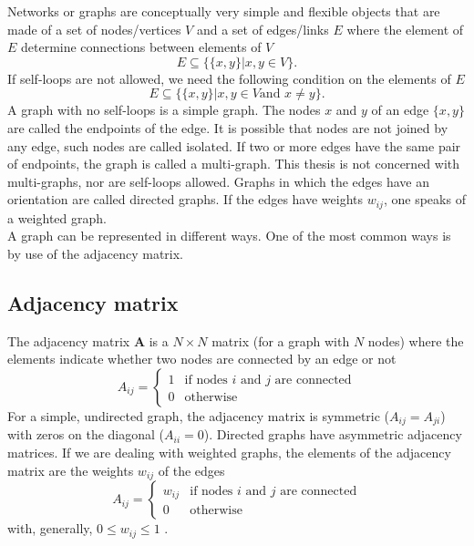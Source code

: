 \documentclass[11 pt , letterpaper , twoside , openright]{book}
\begin{document}
Networks or graphs are conceptually very simple and flexible objects that are made of a set of nodes/vertices $V$ and a set of edges/links $E$ where the element of $E$ determine connections between elements of $V$ \cite{Costa2018}
\begin{equation}
	E \subseteq \{\{x, y\}| x, y \in V \}.
\end{equation}
If self-loops are not allowed, we need the following condition on the elements of $E$
\begin{equation}
	E \subseteq \{\{x, y\}| x, y \in V \text{and\ } x \neq y \}.
\end{equation}
A graph with no self-loops is a simple graph. The nodes $x$ and $y$ of an edge $\{x, y\}$ are called the endpoints of the edge. It is possible that nodes are not joined by any edge, such nodes are called isolated. If two or more edges have the same pair of endpoints, the graph is called a multi-graph. This thesis is not concerned with multi-graphs, nor are self-loops allowed. Graphs in which the edges have an orientation are called directed graphs. If the edges have weights $w_{ij}$, one speaks of a weighted graph.\\
A graph can be represented in different ways. One of the most common ways is by use of the adjacency matrix.\\

\subsection{Adjacency matrix}

The adjacency matrix \textbf{A} is a $N \times N$ matrix (for a graph with $N$ nodes) where the elements indicate whether two nodes are connected by an edge or not \cite{Mata2020}
\begin{equation}
	A_{ij} = 
	\begin{cases}
		1 & \text{if nodes $i$ and $j$ are connected}\\
		0 & \text{otherwise}
	\end{cases}
\end{equation}
For a simple, undirected graph, the adjacency matrix is symmetric ($A_{ij} = A_{ji}$) with zeros on the diagonal ($A_{ii} = 0$). Directed graphs have asymmetric adjacency matrices. If we are dealing with weighted graphs, the elements of the adjacency matrix are the weights $w_{ij}$ of the edges
\begin{equation}
	A_{ij} = 
	\begin{cases}
		w_{ij} & \text{if nodes $i$ and $j$ are connected}\\
		0 & \text{otherwise}
	\end{cases}
\end{equation}
with, generally, $0 \leqslant w_{ij} \leqslant 1$ \cite{Mata2020}. \\
\end{document}
